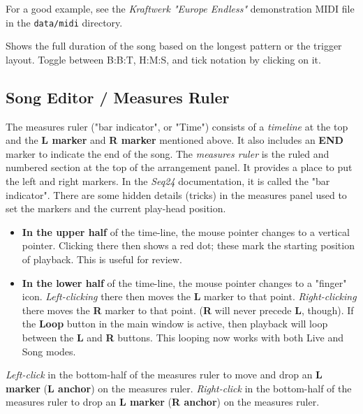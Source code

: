    For a good example, see the \textsl{Kraftwerk "Europe Endless"}
   demonstration MIDI file in the \texttt{data/midi} directory.

   Shows the full duration of the song based on the longest pattern or
   the trigger layout.
   Toggle between B:B:T, H:M:S, and tick notation by clicking on it.

\subsection{Song Editor / Measures Ruler}
\label{subsec:song_editor_measures_ruler}

   The measures ruler ("bar indicator", or "Time")
   consists of a \textsl{timeline} at the top and the 
   \textbf{L marker} and \textbf{R marker} mentioned above.
   It also includes an \textbf{END} marker to indicate the
   end of the song.
   The \textsl{measures ruler} is the ruled and numbered section at the top
   of the arrangement panel.  It provides a place to put the left and right
   markers.  In the \textsl{Seq24} documentation, it is called the "bar
   indicator".
   There are some hidden details (tricks) in the measures panel used to
   set the markers and the current play-head position.

   \begin{itemize}
      \item \textbf{In the upper half} of the time-line,
         the mouse pointer changes to a vertical pointer.
         Clicking there then shows a red dot; these mark
         the starting position of playback.
         This is useful for review.
      \item \textbf{In the lower half} of the time-line,
         the mouse pointer changes to a "finger" icon.
         \textsl{Left-clicking} there then moves the \textbf{L}
         marker to that point.
         \textsl{Right-clicking} there moves the \textbf{R} marker to that point.
         (\textbf{R} will never precede \textbf{L}, though).
         If the \textbf{Loop} button in the main window is active, then
         playback will loop between the \textbf{L} and \textbf{R} buttons.
         This looping now works with both Live and Song modes.
   \end{itemize}

   \textsl{Left-click} in the bottom-half of the
   measures ruler to move and drop an
   \textbf{L marker} (\textbf{L anchor}) on the measures ruler.
   \textsl{Right-click} in the bottom-half of the measures ruler to drop an
   \textbf{L marker} (\textbf{R anchor}) on the measures ruler.
   
